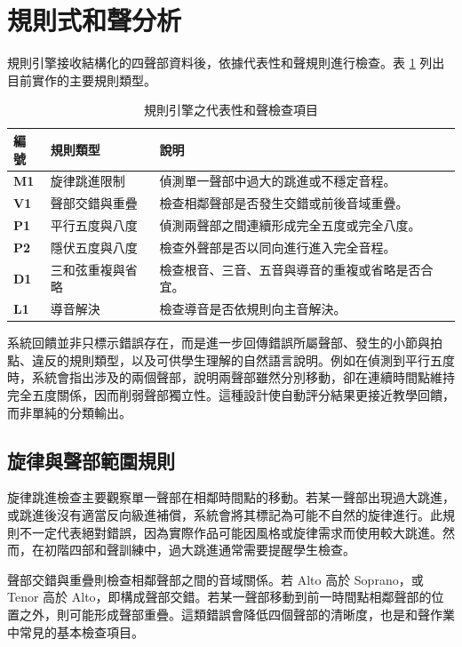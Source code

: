 \documentclass[12pt,a4paper]{article}
\begin{document}
\section{規則式和聲分析}

規則引擎接收結構化的四聲部資料後，依據代表性和聲規則進行檢查。表 \ref{tab:rules} 列出目前實作的主要規則類型。

\begin{table}[htbp]
  \centering
  \caption{規則引擎之代表性和聲檢查項目}
  \label{tab:rules}
  \begin{tabular}{>{\bfseries}p{1.4cm}p{4.2cm}p{7.2cm}}
    \toprule
    編號 & 規則類型 & 說明 \\
    \midrule
    M1 & 旋律跳進限制 & 偵測單一聲部中過大的跳進或不穩定音程。 \\
    V1 & 聲部交錯與重疊 & 檢查相鄰聲部是否發生交錯或前後音域重疊。 \\
    P1 & 平行五度與八度 & 偵測兩聲部之間連續形成完全五度或完全八度。 \\
    P2 & 隱伏五度與八度 & 檢查外聲部是否以同向進行進入完全音程。 \\
    D1 & 三和弦重複與省略 & 檢查根音、三音、五音與導音的重複或省略是否合宜。 \\
    L1 & 導音解決 & 檢查導音是否依規則向主音解決。 \\
    \bottomrule
  \end{tabular}
\end{table}

系統回饋並非只標示錯誤存在，而是進一步回傳錯誤所屬聲部、發生的小節與拍點、違反的規則類型，以及可供學生理解的自然語言說明。例如在偵測到平行五度時，系統會指出涉及的兩個聲部，說明兩聲部雖然分別移動，卻在連續時間點維持完全五度關係，因而削弱聲部獨立性。這種設計使自動評分結果更接近教學回饋，而非單純的分類輸出。

\subsection{旋律與聲部範圍規則}

旋律跳進檢查主要觀察單一聲部在相鄰時間點的移動。若某一聲部出現過大跳進，或跳進後沒有適當反向級進補償，系統會將其標記為可能不自然的旋律進行。此規則不一定代表絕對錯誤，因為實際作品可能因風格或旋律需求而使用較大跳進。然而，在初階四部和聲訓練中，過大跳進通常需要提醒學生檢查。

聲部交錯與重疊則檢查相鄰聲部之間的音域關係。若 Alto 高於 Soprano，或 Tenor 高於 Alto，即構成聲部交錯。若某一聲部移動到前一時間點相鄰聲部的位置之外，則可能形成聲部重疊。這類錯誤會降低四個聲部的清晰度，也是和聲作業中常見的基本檢查項目。
\end{document}
